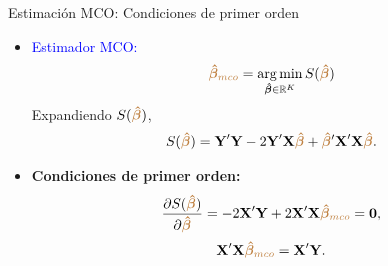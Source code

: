 \documentclass[9pt, xcolor=dvipsnames]{beamer}
\begin{document}
\begin{frame}{Estimación MCO: Condiciones de primer orden}
\begin{itemize}
	\item \textcolor{blue}{Estimador MCO:}
    \begin{align*}
	\begin{split}
		\textcolor{brown}{\betaBH_{mco}} = \argmin_{\betaBH \in \mathbb{R}^K} S(\textcolor{brown}{\betaBH})
	\end{split}
    \end{align*} 
    Expandiendo $S(\textcolor{brown}{\boldsymbol{\hat{\beta}}})$,\vspace{0.0cm}
    \begin{align*}
    \begin{split}
        S(\textcolor{brown}{\boldsymbol{\hat{\beta}}}) = \textbf{Y}'\textbf{Y} - 2 \textbf{Y}'\textbf{X} \textcolor{brown}{\boldsymbol{\hat{\beta}}} + \textcolor{brown}{\boldsymbol{\hat{\beta}}}' \textbf{X}' \textbf{X} \textcolor{brown}{\boldsymbol{\hat{\beta}}}.
    \end{split}
    \end{align*}\vspace{0.0cm}
    \item[1.] \textbf{Condiciones de primer orden:}\vspace{0.1cm}
    \begin{align*}
    \begin{split}
        \frac{\partial S(\textcolor{brown}{\boldsymbol{\hat{\beta}}})}{\partial \textcolor{brown}{\boldsymbol{\hat{\beta}}}} = -2 \textbf{X}' \textbf{Y} + 2 \textbf{X}' \textbf{X} \textcolor{brown}{\boldsymbol{\hat{\beta}}_{mco}} = \textbf{0},
    \end{split}
    \end{align*}
    \begin{align*}
    	\begin{split}
    		\textbf{X}' \textbf{X} \textcolor{brown}{\boldsymbol{\hat{\beta}}_{mco}} = \textbf{X}' \textbf{Y}.
    	\end{split}
    \end{align*}
\end{itemize}
\end{frame}
\end{document}
